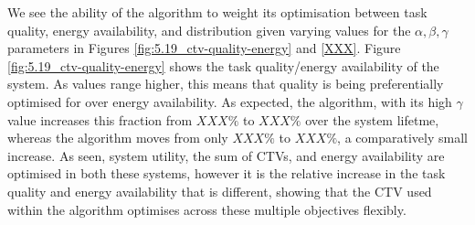 We see the ability of the algorithm to weight its optimisation between task quality, energy availability, and distribution given varying values for the $\alpha, \beta, \gamma$ parameters in Figures \ref{fig:5.19_ctv-quality-energy} and  \ref{XXX}. Figure \ref{fig:5.19_ctv-quality-energy} shows the task quality/energy availability of the system. As values range higher, this means that quality is being preferentially optimised for over energy availability. As expected, the \algorithmQuality{}{} algorithm, with its high $\gamma$ value increases this fraction from $XXX\%$ to $XXX\%$ over the system lifetme, whereas the \algorithmEnergy{}{} algorithm moves from only $XXX\%$ to $XXX\%$, a comparatively small increase. As seen, system utility, the sum of CTVs, and energy availability are optimised in both these systems, however it is the relative increase in the task quality and energy availability that is different, showing that the CTV used within the algorithm optimises across these multiple objectives flexibly. 



